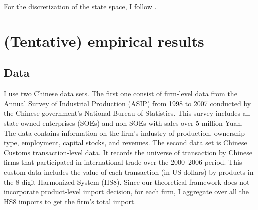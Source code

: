 \documentclass[11pt,letter]{article}
\newcounter{theo}[section] \setcounter{theo}{0}
\newcounter{lem}[section] \setcounter{lem}{0}
\begin{document}
\begin{appendices}
For the discretization of the state space, I follow \citet{Aw2011}.
%
%
%
%
%
%


\section{(Tentative) empirical results}\label{empresult}

\subsection{Data}\label{data}

I use two Chinese data sets. The first one consist of firm-level data from the Annual Survey of Industrial Production (ASIP) from 1998 to 2007 conducted by the Chinese government's National Bureau of Statistics. This survey includes all state-owned enterprises (SOEs) and non SOEs with sales over 5 million Yuan. The data contains information on the firm's industry of production, ownership type, employment, capital stocks, and revenues. The second data set is Chinese Customs transaction-level data. It records the universe of transaction by Chinese firms that participated in international trade over the 2000--2006 period. This custom data includes the value of each transaction (in US dollars) by products in the 8 digit Harmonized System (HS8). Since our theoretical framework does not incorporate product-level import decision, for each firm, I aggregate over all the  HS8 imports to get the firm's total import. 




\end{appendices}
\end{document}
